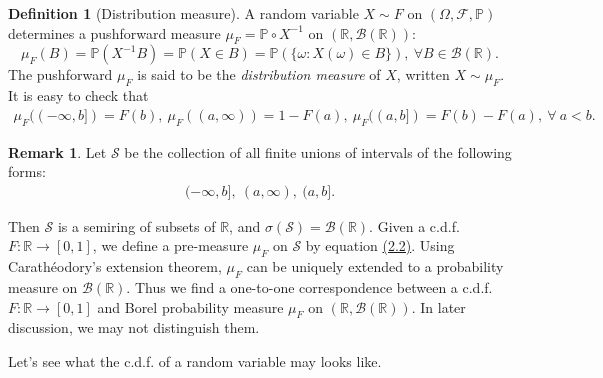 \documentclass{article}
\numberwithin{equation}{section}
\theoremstyle{plain}
\theoremstyle{definition}
\newtheorem{definition}[theorem]{Definition}
\newtheorem*{remark}{Remark}
\begin{document}
\begin{definition}[Distribution measure]\label{def:2.3} A random variable $X\sim F$ on $(\Omega,\mathscr{F},\mathbb{P})$ determines a pushforward measure $\mu_F=\mathbb{P}\circ X^{-1}$ on $(\mathbb{R},\mathscr{B}(\mathbb{R}))$:
$$\mu_F(B)=\mathbb{P}\left(X^{-1}B\right) = \mathbb{P}\left(X\in B\right) = \mathbb{P}\left(\{\omega:X(\omega)\in B\}\right),\ \forall B\in\mathscr{B}(\mathbb{R}).$$
The pushforward $\mu_F$ is said to be the \textit{distribution measure} of $X$, written $X\sim\mu_F$. It is easy to check that
\begin{align*}
	\mu_F((-\infty,b]) = F(b),\ \mu_F((a,\infty)) = 1-F(a),\ \mu_F((a,b]) = F(b)-F(a),\ \forall\ a<b.\tag{2.2}\label{eq:2.2}
\end{align*}
\end{definition}
\begin{remark} Let $\mathscr{S}$ be the collection of all finite unions of intervals of the following forms:
\begin{align*}
	(-\infty,b],\ (a,\infty),\ (a,b].
\end{align*}

Then $\mathscr{S}$ is a semiring of subsets of $\mathbb{R}$, and $\sigma(\mathscr{S})=\mathscr{B}(\mathbb{R})$. Given a c.d.f. $F:\mathbb{R}\to[0,1]$, we define a pre-measure $\mu_F$ on $\mathscr{S}$ by equation \hyperref[eq:2.2]{(2.2)}. Using Carathéodory's extension theorem, $\mu_F$ can be uniquely extended to a probability measure on $\mathscr{B}(\mathbb{R})$. Thus we find a one-to-one correspondence between a c.d.f. $F:\mathbb{R}\to[0,1]$ and Borel probability measure $\mu_F$ on $(\mathbb{R},\mathscr{B}(\mathbb{R}))$. In later discussion, we may not distinguish them.
\end{remark}

Let's see what the c.d.f. of a random variable may looks like.
\end{document}
